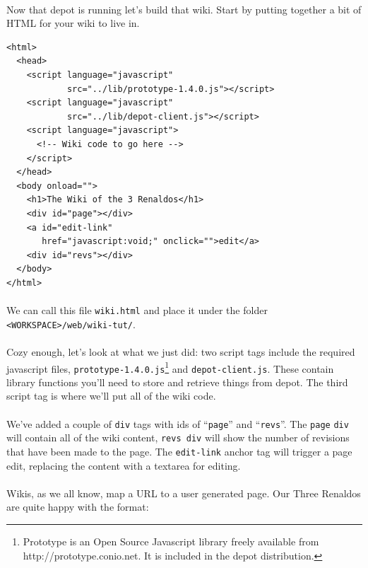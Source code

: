 \documentclass{report}
\begin{document}
\paragraph{}
Now that depot is running let's build that wiki. Start by putting
together a bit of HTML for your wiki to live in.

\begin{Verbatim}[frame=single]
<html>
  <head>
    <script language="javascript" 
            src="../lib/prototype-1.4.0.js"></script>
    <script language="javascript" 
            src="../lib/depot-client.js"></script>
    <script language="javascript">
      <!-- Wiki code to go here -->
    </script>
  </head>
  <body onload="">
    <h1>The Wiki of the 3 Renaldos</h1>
    <div id="page"></div>
    <a id="edit-link" 
       href="javascript:void;" onclick="">edit</a>
    <div id="revs"></div>
  </body>
</html>
\end{Verbatim}

\paragraph{}
We can call this file \texttt{wiki.html} and place it under the folder
\texttt{<WORKSPACE>/web/wiki-tut/}.

\paragraph{}
Cozy enough, let's look at what we just did: two script tags include
the required javascript files,
\texttt{prototype-1.4.0.js}\footnote{Prototype is an Open Source
  Javascript library freely available from
  http://prototype.conio.net. It is included in the depot
  distribution.} and \texttt{depot-client.js}. These contain library
functions you'll need to store and retrieve things from depot. The
third script tag is where we'll put all of the wiki code.

\paragraph{}
We've added a couple of \texttt{div} tags with ids of
``\texttt{page}'' and ``\texttt{revs}''. The \texttt{page}
\texttt{div} will contain all of the wiki content, \texttt{revs div}
will show the number of revisions that have been made to the page. The
\texttt{edit-link} anchor tag will trigger a page edit, replacing the
content with a textarea for editing.

\paragraph{}
Wikis, as we all know, map a URL to a user generated page. Our Three
Renaldos are quite happy with the format: 
\end{document}
